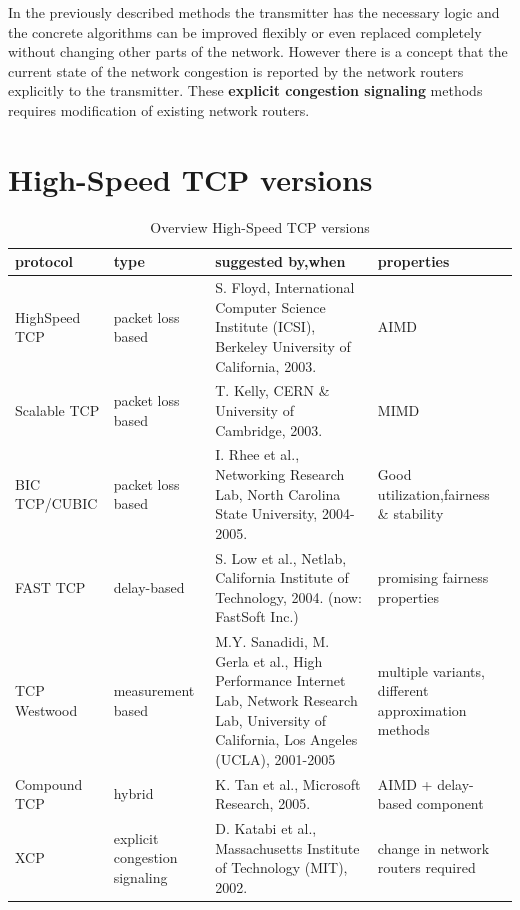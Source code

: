 \documentclass[a4paper]{article}
\begin{document}
In the previously described methods the transmitter has the necessary logic  and the concrete algorithms can be improved flexibly or even replaced completely without changing other parts of the network. However there is a concept that the current state of the network congestion is reported by the network routers explicitly to the transmitter. These \textbf{explicit congestion signaling} methods requires modification of existing network routers.

\section{High-Speed TCP versions}
\begin{table}
\begin{tabular}{|p{}|p{}|p{}|p{}|}\hline 
\cellcolor{blue!25}protocol & \cellcolor{blue!25}type & \cellcolor{blue!25}suggested by,when & \cellcolor{blue!25}properties \\\hline 
\cellcolor{blue!25}HighSpeed TCP & packet loss based & S. Floyd, International Computer Science Institute (ICSI), Berkeley University of California, 2003.  & AIMD \\\hline 
\cellcolor{blue!25}Scalable TCP & packet loss based & T. Kelly, CERN \& University of Cambridge, 2003. & MIMD \\\hline
\cellcolor{blue!25}BIC TCP/CUBIC & packet loss based & I. Rhee et al., Networking Research Lab, North Carolina State University, 2004-2005. & Good utilization,fairness \& stability \\\hline
\cellcolor{blue!25}FAST TCP & delay-based & S. Low et al., Netlab, California Institute of Technology, 2004. (now: FastSoft Inc.)  & promising fairness properties \\\hline
\cellcolor{blue!25}TCP Westwood & measurement based & M.Y. Sanadidi, M. Gerla et al., High Performance Internet Lab, Network Research Lab, University of California, Los Angeles (UCLA), 2001-2005  & multiple variants, different approximation methods \\\hline
\cellcolor{blue!25}Compound TCP & hybrid & K. Tan et al., Microsoft Research, 2005. & AIMD + delay-based component\\\hline
\cellcolor{blue!25}XCP & explicit congestion signaling & D. Katabi et al., Massachusetts Institute of Technology (MIT), 2002.  & change in network routers required \\\hline
\end{tabular}
\caption{Overview High-Speed TCP versions}
\label{table:tcpver}
\end{table}
\end{document}

